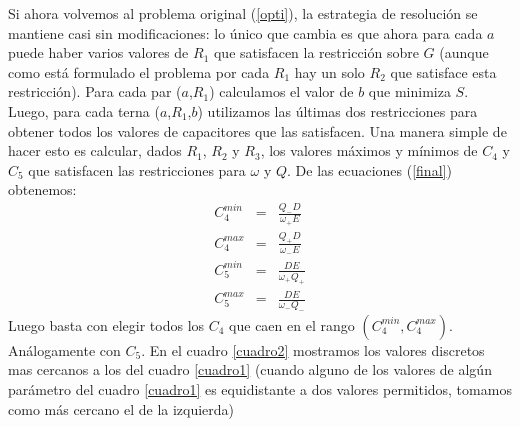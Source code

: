 \documentclass{llncs}
\begin{document}
	Si ahora volvemos al problema original (\ref{opti}), la estrategia de resolución se mantiene 
	casi sin modificaciones: lo único que cambia es que ahora para cada $a$ puede haber varios valores 
	de $R_1$ que satisfacen la restricción sobre $G$ (aunque como está formulado el problema por cada 
	$R_1$ hay un solo $R_2$ que satisface esta restricción). Para cada par ($a$,$R_1$) calculamos el
	valor de $b$ que minimiza $S$. Luego, para cada terna ($a$,$R_1$,$b$) utilizamos
	las últimas dos restricciones para obtener todos los valores de capacitores que
	las satisfacen. Una manera simple de hacer esto es calcular, dados $R_1$, $R_2$
	y $R_3$, los valores máximos y mínimos de $C_4$ y $C_5$ que satisfacen las
	restricciones para $\omega$ y $Q$.  De las ecuaciones (\ref{final}) obtenemos:
	\begin{eqnarray}
	C_4^{min} &=& \frac{Q_-D}{\omega_+E}\nonumber\\
	C_4^{max} &=& \frac{Q_+D}{\omega_-E}\nonumber\\
	C_5^{min} &=& \frac{DE}{\omega_+Q_+}\label{limites}\\
	C_5^{max} &=& \frac{DE}{\omega_-Q_-}\nonumber
	\end{eqnarray}
	Luego basta con elegir todos los $C_4$ que caen en el rango $(C_4^{min},C_4^{max})$. Análogamente con $C_5$. 
	En el cuadro \ref{cuadro2} mostramos los valores discretos mas cercanos a los del cuadro \ref{cuadro1} 
	(cuando alguno de los valores  de algún parámetro del cuadro \ref{cuadro1} es equidistante a dos valores
    permitidos, tomamos como más cercano el de la izquierda)
        
\end{document}
